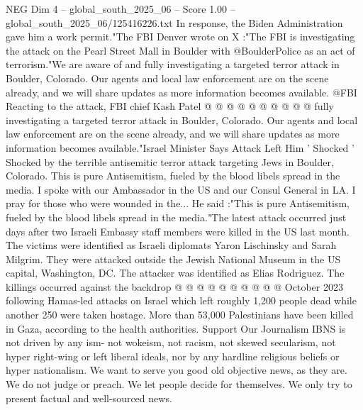 \begin{textsample}{NEG Dim 4 – global\_south\_2025\_06 – Score 1.00 – global\_south\_2025\_06/125416226.txt}
In response, the Biden Administration gave him a work permit."The FBI Denver wrote on X :"The FBI is investigating the attack on the Pearl Street Mall in Boulder with @BoulderPolice as an act of terrorism."We are aware of and fully investigating a targeted terror attack in Boulder, Colorado.
Our agents and local law enforcement are on the scene already, and we will share updates as more information becomes available. @FBI Reacting to the attack, FBI chief Kash Patel @ @ @ @ @ @ @ @ @ @ fully investigating a targeted terror attack in Boulder, Colorado.
Our agents and local law enforcement are on the scene already, and we will share updates as more information becomes available."Israel Minister Says Attack Left Him ' Shocked ' Shocked by the terrible antisemitic terror attack targeting Jews in Boulder, Colorado.
This is pure Antisemitism, fueled by the blood libels spread in the media.
I spoke with our Ambassador in the US and our Consul General in LA.
I pray for those who were wounded in the...
He said :"This is pure Antisemitism, fueled by the blood libels spread in the media."The latest attack occurred just days after two Israeli Embassy staff members were killed in the US last month.
The victims were identified as Israeli diplomats Yaron Lischinsky and Sarah Milgrim.
They were attacked outside the Jewish National Museum in the US capital, Washington, DC.
The attacker was identified as Elias Rodriguez.
The killings occurred against the backdrop @ @ @ @ @ @ @ @ @ @ October 2023 following Hamas-led attacks on Israel which left roughly 1,200 people dead while another 250 were taken hostage.
More than 53,000 Palestinians have been killed in Gaza, according to the health authorities.
Support Our Journalism IBNS is not driven by any ism- not wokeism, not racism, not skewed secularism, not hyper right-wing or left liberal ideals, nor by any hardline religious beliefs or hyper nationalism.
We want to serve you good old objective news, as they are.
We do not judge or preach.
We let people decide for themselves.
We only try to present factual and well-sourced news.

\end{textsample}
